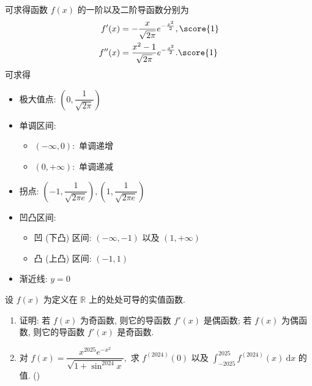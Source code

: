 \begin{solution}
可求得函数 $f(x)$ 的一阶以及二阶导函数分别为
\begin{align*}
    f'(x) & = -\dfrac{x}{\sqrt{2\pi}} e^{-\frac{x^2}{2}}, \score{1} \\
    f''(x) & = \dfrac{x^2-1}{\sqrt{2\pi}} e^{-\frac{x^2}{2}}. \score{1}
\end{align*}
可求得
\begin{itemize}
    \item 极大值点: $\left( 0, \dfrac{1}{\sqrt{2\pi}} \right)$ 
    \item 单调区间:
    \begin{itemize}
        \item $(-\infty, 0):$ 单调递增 
        \item $(0, +\infty):$ 单调递减 
    \end{itemize}
    \item 拐点: $\left( -1, \dfrac{1}{\sqrt{2\pi e}} \right), \left( 1, \dfrac{1}{\sqrt{2\pi e}} \right)$ 
    \item 凹凸区间:
    \begin{itemize}
        \item 凹 (下凸) 区间: $(-\infty, -1)$ 以及 $(1, +\infty)$ 
        \item 凸 (上凸) 区间: $(-1, 1)$ 
    \end{itemize}
    \item 渐近线: $y = 0$ 
\end{itemize}
\end{solution}


\begin{question}[points = 10]
设 $f(x)$ 为定义在 $\mathbb{R}$ 上的处处可导的实值函数.
\begin{enumerate}
\item 证明: 若 $f(x)$ 为奇函数, 则它的导函数 $f'(x)$ 是偶函数; 若 $f(x)$ 为偶函数, 则它的导函数 $f'(x)$ 是奇函数.
\item 对 $\displaystyle f(x) = \dfrac{x^{2025} e^{-x^2}}{\sqrt{1 + \sin^{2024} x}},$ 求 $f^{(2024)}(0)$ 以及 $\displaystyle \int_{-2025}^{2025} f^{(2024)}(x) ~ \mathrm{d} x$ 的值. ()
\end{enumerate}

\end{question}

